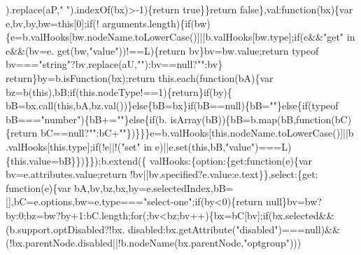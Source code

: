 \begin{DoxyCode}
      ).replace(aP,\textcolor{stringliteral}{" "}).indexOf(bx)>-1)\{\textcolor{keywordflow}{return} \textcolor{keyword}{true}\}\}\textcolor{keywordflow}{return} \textcolor{keyword}{false}\},val:\textcolor{keyword}{function}(bx)\{var e,bv,by,bw=\textcolor{keyword}{this}[0];\textcolor{keywordflow}{if}(!
      arguments.length)\{\textcolor{keywordflow}{if}(bw)\{e=b.valHooks[bw.nodeName.toLowerCase()]||b.valHooks[bw.type];\textcolor{keywordflow}{if}(e&&\textcolor{stringliteral}{"get"} in e&&(bv=e.
      get(bw,\textcolor{stringliteral}{"value"}))!==L)\{\textcolor{keywordflow}{return} bv\}bv=bw.value;\textcolor{keywordflow}{return} typeof bv===\textcolor{stringliteral}{"string"}?bv.replace(aU,\textcolor{stringliteral}{""}):bv==null?\textcolor{stringliteral}{""}:bv\}\textcolor{keywordflow}{
      return}\}by=b.isFunction(bx);\textcolor{keywordflow}{return} this.each(\textcolor{keyword}{function}(bA)\{var bz=b(\textcolor{keyword}{this}),bB;\textcolor{keywordflow}{if}(this.nodeType!==1)\{\textcolor{keywordflow}{return}\}\textcolor{keywordflow}{if}(by)\{
      bB=bx.call(\textcolor{keyword}{this},bA,bz.val())\}\textcolor{keywordflow}{else}\{bB=bx\}\textcolor{keywordflow}{if}(bB==null)\{bB=\textcolor{stringliteral}{""}\}\textcolor{keywordflow}{else}\{\textcolor{keywordflow}{if}(typeof bB===\textcolor{stringliteral}{"number"})\{bB+=\textcolor{stringliteral}{""}\}\textcolor{keywordflow}{else}\{\textcolor{keywordflow}{if}(b.
      isArray(bB))\{bB=b.map(bB,\textcolor{keyword}{function}(bC)\{\textcolor{keywordflow}{return} bC==null?\textcolor{stringliteral}{""}:bC+\textcolor{stringliteral}{""}\})\}\}\}e=b.valHooks[\textcolor{keyword}{this}.nodeName.toLowerCase()]||b
      .valHooks[this.type];\textcolor{keywordflow}{if}(!e||!(\textcolor{stringliteral}{"set"} in e)||e.set(\textcolor{keyword}{this},bB,\textcolor{stringliteral}{"value"})===L)\{this.value=bB\}\})\}\});b.extend(\{
      valHooks:\{option:\{\textcolor{keyword}{get}:\textcolor{keyword}{function}(e)\{var bv=e.attributes.value;\textcolor{keywordflow}{return} !bv||bv.specified?e.value:e.text\}\},select:\{\textcolor{keyword}{get}:\textcolor{keyword}{
      function}(e)\{var bA,bv,bz,bx,by=e.selectedIndex,bB=[],bC=e.options,bw=e.type===\textcolor{stringliteral}{"select-one"};\textcolor{keywordflow}{if}(by<0)\{\textcolor{keywordflow}{return} 
      null\}bv=bw?by:0;bz=bw?by+1:bC.length;\textcolor{keywordflow}{for}(;bv<bz;bv++)\{bx=bC[bv];\textcolor{keywordflow}{if}(bx.selected&&(b.support.optDisabled?!bx.
      disabled:bx.getAttribute(\textcolor{stringliteral}{"disabled"})===null)&&(!bx.parentNode.disabled||!b.nodeName(bx.parentNode,\textcolor{stringliteral}{"optgroup"})))

\end{DoxyCode}
